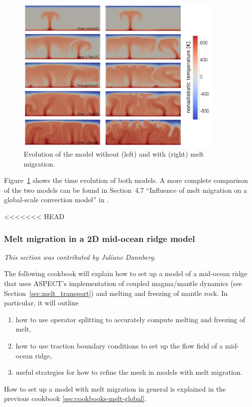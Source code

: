 \documentclass{article}
\newcommand{\aspect}{\textsc{ASPECT}}
\begin{document}
\begin{figure}
    \centering
    \includegraphics[width=0.9\textwidth]{cookbooks/global_melt/model_evolution.pdf}
    \caption{Evolution of the model without (left) and with (right) melt migration.}
    \label{fig:global-melt}
\end{figure}

Figure~\ref{fig:global-melt} shows the time evolution of both models. 
A more complete comparison of the two models can be found in Section~4.7 ``Influence of melt migration on a global-scale 
convection model'' in \cite{dannberg_melt}.

<<<<<<< HEAD
\subsubsection{Melt migration in a 2D mid-ocean ridge model}
\label{sec:cookbooks-mid-ocean-ridge}

\textit{This section was contributed by Juliane Dannberg.}

The following cookbook will explain how to set up a model of a mid-ocean ridge that uses \aspect{}'s 
implementation of coupled magma/mantle dynamics (see Section~\ref{sec:melt_transport}) and melting 
and freezing of mantle rock. 
In particular, it will outline 
\begin{enumerate}
  \item how to use operator splitting to accurately compute melting and freezing of melt, 
  \item how to use traction boundary conditions to set up the flow field of a mid-ocean ridge, 
  \item useful strategies for how to refine the mesh in models with melt migration.
\end{enumerate}
How to set up a model with melt migration in general is explained in the previous cookbook \ref{sec:cookbooks-melt-global}. 
\end{document}
